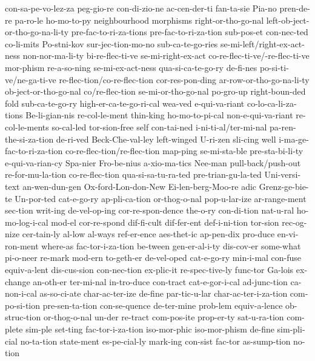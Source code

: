 {  con-sa-pe-vo-lez-za
  peg-gio-re
  con-di-zio-ne
  ac-cen-der-ti
  fan-ta-sie
  Pia-no
  pren-de-re
  pa-ro-le
  ho-mo-to-py
  neighbourhood
  morphisms
  right-or-tho-go-nal
  left-ob-ject-or-tho-go-na-li-ty
  pre-fac-to-ri-za-tions
  pre-fac-to-ri-za-tion
  sub-pos-et
  con-nec-ted
  co-li-mits
  Po-stni-kov
  sur-jec-tion-mo-no
  sub-ca-te-go-ries
  se-mi-left/right-ex-act-ness
  non-nor-ma-li-ty
  bi-re-flec-ti-ve
  se-mi-right-ex-act
  co-re-flec-ti-ve/-re-flec-ti-ve
  mor-phism
  re-a-so-ning
  se-mi-ex-act-ness
  qua-si-ca-te-go-ry
  de-fi-nes
  po-si-ti-ve/ne-ga-ti-ve
  re-flec-tion/co-re-flec-tion
  cor-res-pon-ding
  ar-row-or-tho-go-na-li-ty
  ob-ject-or-tho-go-nal
  co/re-flec-tion
  se-mi-or-tho-go-nal
  po-gro-up
  right-boun-ded
  fold
  sub-ca-te-go-ry
  high-er-ca-te-go-ri-cal
  wea-ved
  e-qui-va-riant
  co-lo-ca-li-za-tions
  Be-li-gian-nis
  re-col-le-ment
  thin-king
  ho-mo-to-pi-cal
  non-e-qui-va-riant
  re-col-le-ments
  so-cal-led
  tor-sion-free
  self
  con-tai-ned
  i-ni-ti-al/ter-mi-nal
  pa-ren-the-si-za-tion
  de-ri-ved
  Beck-Che-val-ley
  left-winged
  U-ri-zen
  sli-cing
  well
  i-ma-ge-fac-to-ri-za-tion
  co-re-flec-tion/re-flec-tion
  map-ping
  se-mi-sta-ble
  pre-sta-bi-li-ty
  e-qui-va-rian-cy
  Spa-nier
  Fro-be-nius
  a-xio-ma-tics
  Nee-man
  pull-back/push-out
  re-for-mu-la-tion
  co-re-flec-tion
  qua-si-sa-tu-ra-ted
  pre-trian-gu-la-ted
  Uni-versi-text
  an-wen-dun-gen
  Ox-ford-Lon-don-New
  Ei-len-berg-Moo-re
  adic
  Grenz-ge-bie-te
  Un-por-ted
cat-e-go-ry
ap-pli-ca-tion
or-thog-o-nal
pop-u-lar-ize
ar-range-ment
sec-tion
writ-ing
de-vel-op-ing
cor-re-spon-dence
the-o-ry
con-di-tion
nat-u-ral
ho-mo-log-i-cal
mod-el
cor-re-spond
dif-fi-cult
dif-fer-ent
def-i-ni-tion
tor-sion
rec-og-nize
cer-tain-ly
al-low
al-ways
ref-er-ence
aes-thet-ic
ap-pen-dix
pro-duce
en-vi-ron-ment
where-as
fac-tor-i-za-tion
be-tween
gen-er-al-i-ty
dis-cov-er
some-what
pi-o-neer
re-mark
mod-ern
to-geth-er
de-vel-oped
cat-e-go-ry
min-i-mal
con-fuse
equiv-a-lent
dis-cus-sion
con-nec-tion
ex-plic-it
re-spec-tive-ly
func-tor
Ga-lois
ex-change
an-oth-er
ter-mi-nal
in-tro-duce
con-tract
cat-e-gor-i-cal
ad-junc-tion
ca-non-i-cal
as-so-ci-ate
char-ac-ter-ize
de-fine
par-tic-u-lar
char-ac-ter-i-za-tion
com-po-si-tion
pre-sen-ta-tion
con-se-quence
de-ter-mine
prob-lem
equiv-a-lence
ob-struc-tion
or-thog-o-nal
un-der
re-tract
com-pos-ite
prop-er-ty
sat-u-ra-tion
com-plete
sim-ple
set-ting
fac-tor-i-za-tion
iso-mor-phic
iso-mor-phism
de-fine
sim-pli-cial
no-ta-tion
state-ment
es-pe-cial-ly
mark-ing
con-sist
fac-tor
as-sump-tion
no-tion
}
